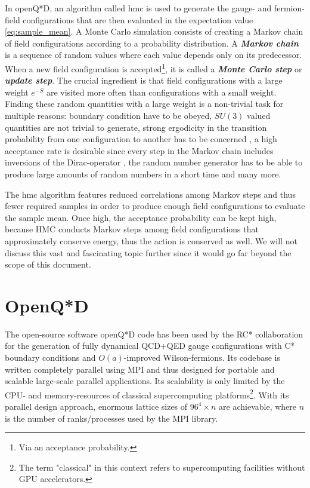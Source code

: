 \documentclass{article}
\theoremstyle{plain} %
\theoremstyle{convention} %
\theoremstyle{remark} %
\def\df#1{\textbf{\textit{#1}}}
\numberwithin{equation}{section}
\begin{document}
In openQ*D, an algorithm called \acrfull{hmc} is used to generate the gauge- and fermion-field configurations that are then evaluated in the expectation value \eqref{eq:sample_mean}. A Monte Carlo simulation consists of creating a Markov chain of field configurations according to a probability distribution. A \df{Markov chain} is a sequence of random values where each value depends only on its predecessor. When a new field configuration is accepted\footnote{Via an acceptance probability.}, it is called a \df{Monte Carlo step} or \df{update step}. The crucial ingredient is that field configurations with a large weight $e^{-S}$ are visited more often than configurations with a small weight. Finding these random quantities with a large weight is a non-trivial task for multiple reasons: boundary condition have to be obeyed, $SU(3)$ valued quantities are not trivial to generate, strong ergodicity in the transition probability from one configuration to another has to be concerned \cite{finkler2020,adler1988}, a high acceptance rate is desirable since every step in the Markov chain includes inversions of the Dirac-operator \cite{gupta1990}, the random number generator has to be able to produce large amounts of random numbers in a short time \cite{gentle2003} and many more.

The \acrshort{hmc} algorithm \cite{duane1987} features reduced correlations among Markov steps and thus fewer required samples in order to produce enough field configurations to evaluate the sample mean. Once high, the acceptance probability can be kept high, because HMC conducts Markov steps among field configurations that approximately conserve energy, thus the action is conserved as well. We will not discuss this vast and fascinating topic further since it would go far beyond the scope of this document.

\section{OpenQ*D}

\label{sec:openqxd}

The open-source software openQ*D code has been used by the RC* collaboration for the generation of fully dynamical QCD+QED gauge configurations with C* boundary conditions and $O(a)$-improved Wilson-fermions. Its codebase is written completely parallel using MPI and thus designed for portable and scalable large-scale parallel applications. Its scalability is only limited by the CPU- and memory-resources of classical supercomputing platforms\footnote{The term "classical" in this context refers to supercomputing facilities without GPU accelerators.}. With its parallel design approach, enormous lattice sizes of $96^4 \times n$ are achievable, where $n$ is the number of ranks/processes used by the MPI library.
\end{document}

